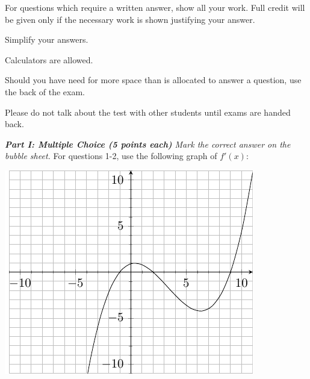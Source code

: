 \documentclass[11pt]{article}
\begin{document}
\Head
\begin{instructions}
\item For questions which require a written answer, show all your work.  Full credit will be given only if the necessary work is shown justifying your answer.
\item Simplify your answers.
\item Calculators are allowed.
\item Should you have need for more space than is allocated to answer a question, use the back of the exam.
\item Please do not talk about the test with other students until exams are handed back.
\end{instructions}
\newpage

\vspace{.2in}

\noindent \emph{{\bf Part I: Multiple Choice (5 points each)} Mark the correct
answer on the bubble sheet.}
For questions 1-2, use the following graph of $f'(x)$:\\


\begin{minipage}{\linewidth}%
\centering
\makebox[\linewidth]{}
\includegraphics{exam2graph1.pdf}
\label{graph1exam1}%
\end{minipage}
\end{document}
